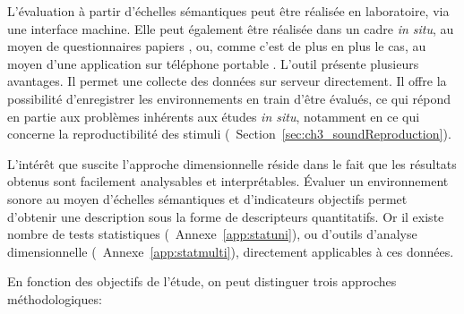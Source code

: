 L'évaluation à partir d'échelles sémantiques peut être réalisée en laboratoire, via une interface machine. Elle peut également être réalisée dans un cadre \emph{in situ}, au moyen de questionnaires papiers \citep{jeon2013soundwalk,torija2013application}, ou, comme c'est de plus en plus le cas, au moyen d'une application sur téléphone portable \citep{kardous2014evaluation,ricciardi2015sound}. L'outil présente plusieurs avantages. Il permet une collecte des données sur serveur directement. Il offre la possibilité d'enregistrer les environnements en train d'être évalués, ce qui répond en partie aux problèmes inhérents aux études \emph{in situ}, notamment en ce qui concerne la reproductibilité des stimuli (\cf~Section~\ref{sec:ch3_soundReproduction}).

L'intérêt que suscite l'approche dimensionnelle réside dans le fait que les résultats obtenus sont facilement analysables et interprétables. Évaluer un environnement sonore au moyen d'échelles sémantiques et d'indicateurs objectifs permet d'obtenir une description sous la forme de descripteurs quantitatifs. Or il existe nombre de tests statistiques (\cf~Annexe~\ref{app:statuni}), ou d'outils d'analyse dimensionnelle (\cf~Annexe~\ref{app:statmulti}), directement applicables à ces données.

En fonction des objectifs de l'étude, on peut distinguer trois approches méthodologiques:

